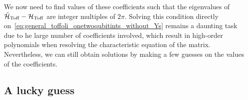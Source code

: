 We now need to find values of these coefficients such that the eigenvalues of $\tilde{{\mathcal{H}}}_{\operatorname{Toff}}-{\mathcal{H}}_{\operatorname{Toff}}$ are integer multiples of $2\pi$.
Solving this condition directly on~\cref{eq:general_toffoli_onetwoqubitints_without_Ys} remains a daunting task due to he large number of coefficients involved, which result in high-order polynomials when resolving the characteristic equation of the matrix.
Nevertheless, we can still obtain solutions by making a few guesses on the values of the coefficients.


\subsection{A lucky guess}

